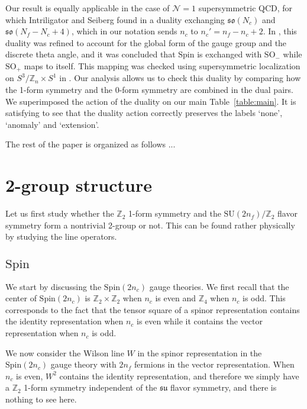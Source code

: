 \documentclass[12pt]{article}
\numberwithin{equation}{section}
\def\Nequals#1{$\mathcal{N}{=}#1$}
\def\bZ{\mathbb{Z}}
\def\SU{\mathrm{SU}}
\def\SO{\mathrm{SO}}
\def\su{\mathfrak{su}}
\def\so{\mathfrak{so}}
\def\Spin{\mathrm{Spin}}
\begin{document}
Our result is equally applicable in the case of \Nequals1 supersymmetric QCD, for which
Intriligator and Seiberg found in \cite{Intriligator:1995id} a duality exchanging $\so(N_c)$ and $\so(N_f-N_c+4)$,
which in our notation sends $n_c$ to $n_c'=n_f-n_c+2$.
In \cite{Aharony:2013hda}, this duality was refined to account for the global form of the gauge group and the discrete theta angle, and it was concluded that $\Spin$ is exchanged with $\SO_-$ while $\SO_+$ maps to itself.
This mapping was checked using supersymmetric localization on $S^3/\bZ_n \times S^1$ in \cite{Razamat:2013opa}.
Our analysis allows us to check this duality by comparing how the 1-form symmetry and the 0-form symmetry are combined in the dual pairs.
We superimposed the action of the duality on our main Table~\ref{table:main}.
It is satisfying to see that the duality action correctly preserves the labels `none', `anomaly' and `extension'.

The rest of the paper is organized as follows ...

\section{2-group structure}
\label{sec:2-group}
Let us first study whether the $\bZ_2$ 1-form symmetry and the $\SU(2n_f)/\bZ_2$ flavor symmetry form a nontrivial 2-group or not. 
This can be found rather physically by studying the line operators. 

\subsection{$\Spin$}
We start by discussing the $\Spin(2n_c)$ gauge theories. 
We first recall that the center of $\Spin(2n_c)$ is $\bZ_2\times \bZ_2$ when $n_c$ is even and $\bZ_4$ when $n_c$ is odd.
This corresponds to the fact that the tensor square of a spinor representation contains the identity representation when $n_c$ is even while it contains the vector representation when $n_c$ is odd.

We now consider the Wilson line $W$ in the spinor representation in the $\Spin(2n_c)$ gauge theory with $2n_f$ fermions in the vector representation.
When $n_c$ is even, $W^2$ contains the identity representation, and therefore we simply have a $\bZ_2$ 1-form symmetry independent of the $\su$ flavor symmetry, and there is nothing to see here.
\end{document}
